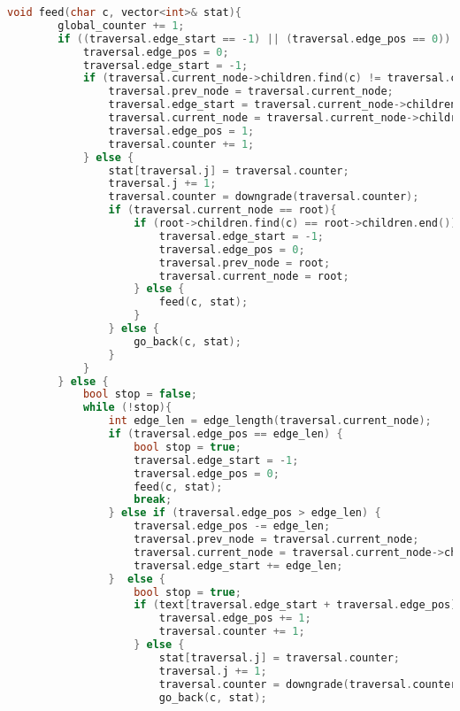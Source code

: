 \begin{lstlisting}[language=C++]
    void feed(char c, vector<int>& stat){
        global_counter += 1;
        if ((traversal.edge_start == -1) || (traversal.edge_pos == 0)) {
            traversal.edge_pos = 0;
            traversal.edge_start = -1;
            if (traversal.current_node->children.find(c) != traversal.current_node->children.end()){
                traversal.prev_node = traversal.current_node;
                traversal.edge_start = traversal.current_node->children[c]->start;
                traversal.current_node = traversal.current_node->children[c];
                traversal.edge_pos = 1;
                traversal.counter += 1;
            } else {
                stat[traversal.j] = traversal.counter;
                traversal.j += 1;
                traversal.counter = downgrade(traversal.counter);
                if (traversal.current_node == root){
                    if (root->children.find(c) == root->children.end()) {
                        traversal.edge_start = -1;
                        traversal.edge_pos = 0;
                        traversal.prev_node = root;
                        traversal.current_node = root;
                    } else {
                        feed(c, stat);
                    }
                } else {
                    go_back(c, stat);
                }
            }
        } else {
            bool stop = false;
            while (!stop){
                int edge_len = edge_length(traversal.current_node);
                if (traversal.edge_pos == edge_len) {
                    bool stop = true;
                    traversal.edge_start = -1;
                    traversal.edge_pos = 0;
                    feed(c, stat);
                    break;
                } else if (traversal.edge_pos > edge_len) {
                    traversal.edge_pos -= edge_len;
                    traversal.prev_node = traversal.current_node;
                    traversal.current_node = traversal.current_node->children[text[traversal.edge_start + edge_len]];
                    traversal.edge_start += edge_len;
                }  else {
                    bool stop = true;
                    if (text[traversal.edge_start + traversal.edge_pos] == c){
                        traversal.edge_pos += 1;
                        traversal.counter += 1;
                    } else {
                        stat[traversal.j] = traversal.counter;
                        traversal.j += 1;
                        traversal.counter = downgrade(traversal.counter);
                        go_back(c, stat);
                        

\end{lstlisting}
